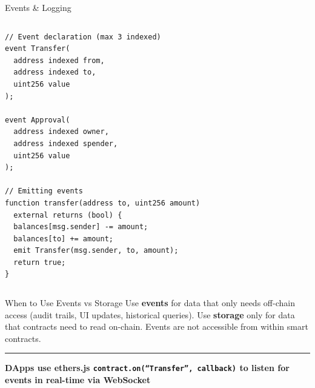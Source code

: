 \documentclass[8pt,aspectratio=169]{beamer}
\newcommand{\bottomnote}[1]{\vfill\vspace{-2mm}\textcolor{mllavender2}{\rule{\textwidth}{0.4pt}}\vspace{1mm}\footnotesize\textbf{#1}}
\begin{document}
\begin{frame}[fragile]{Events \& Logging}
\begin{columns}
\begin{lstlisting}
// Event declaration (max 3 indexed)
event Transfer(
  address indexed from,
  address indexed to,
  uint256 value
);

event Approval(
  address indexed owner,
  address indexed spender,
  uint256 value
);

// Emitting events
function transfer(address to, uint256 amount)
  external returns (bool) {
  balances[msg.sender] -= amount;
  balances[to] += amount;
  emit Transfer(msg.sender, to, amount);
  return true;
}
\end{lstlisting}
\end{columns}
\vspace{2mm}
\begin{alertblock}{When to Use Events vs Storage}
\small Use \textbf{events} for data that only needs off-chain access (audit trails, UI updates, historical queries). Use \textbf{storage} only for data that contracts need to read on-chain. Events are not accessible from within smart contracts.
\end{alertblock}
\bottomnote{DApps use ethers.js \texttt{contract.on(``Transfer'', callback)} to listen for events in real-time via WebSocket}
\end{frame}
\end{document}
